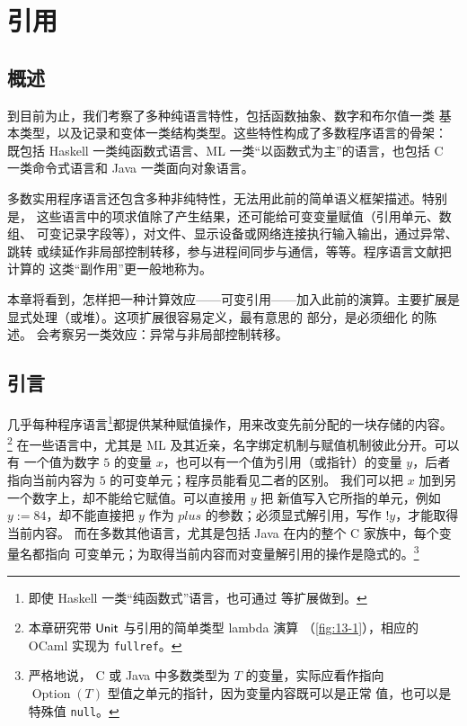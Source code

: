 
\chapter{引用}
\label{chap:13}

\section*{概述}

到目前为止，我们考察了多种纯语言特性，包括函数抽象、数字和布尔值一类
基本类型，以及记录和变体一类结构类型。这些特性构成了多数程序语言的骨架：
既包括 Haskell 一类纯函数式语言、ML 一类“以函数式为主”的语言，也包括 C
一类命令式语言和 Java 一类面向对象语言。

多数实用程序语言还包含多种非纯特性，无法用此前的简单语义框架描述。特别是，
这些语言中的项求值除了产生结果，还可能给可变变量赋值（引用单元、数组、
可变记录字段等），对文件、显示设备或网络连接执行输入输出，通过异常、跳转
或续延作非局部控制转移，参与进程间同步与通信，等等。程序语言文献把计算的
这类“副作用”更一般地称为。

本章将看到，怎样把一种计算效应——可变引用——加入此前的演算。主要扩展是
显式处理（或堆）。这项扩展很容易定义，最有意思的
部分，是必须细化
的陈述。
会考察另一类效应：异常与非局部控制转移。

\section{引言}
\label{sec:13.1}

几乎每种程序语言\footnote{即使 Haskell 一类“纯函数式”语言，也可通过
等扩展做到。}都提供某种赋值操作，用来改变先前分配的一块存储的内容。
\footnote{本章研究带 \(\mathsf{Unit}\) 与引用的简单类型 lambda 演算
（\cref{fig:13-1}），相应的 OCaml 实现为 \texttt{fullref}。}
在一些语言中，尤其是 ML 及其近亲，名字绑定机制与赋值机制彼此分开。可以有
一个值为数字 \(5\) 的变量 \(x\)，也可以有一个值为引用（或指针）的变量
\(y\)，后者指向当前内容为 \(5\) 的可变单元；程序员能看见二者的区别。
我们可以把 \(x\) 加到另一个数字上，却不能给它赋值。可以直接用 \(y\) 把
新值写入它所指的单元，例如 \(y:=84\)，却不能直接把 \(y\) 作为
\(\mathit{plus}\) 的参数；必须显式解引用，写作 \(!y\)，才能取得当前内容。
而在多数其他语言，尤其是包括 Java 在内的整个 C 家族中，每个变量名都指向
可变单元；为取得当前内容而对变量解引用的操作是隐式的。\footnote{严格地说，
C 或 Java 中多数类型为 \(T\) 的变量，实际应看作指向
\(\operatorname{Option}(T)\) 型值之单元的指针，因为变量内容既可以是正常
值，也可以是特殊值 \texttt{null}。}

